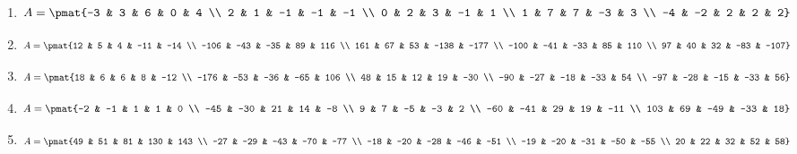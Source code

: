 \begin{enumerate}
\item

\begin{align*}
A = \pmat{-3 & 3 & 6 & 0 & 4 \\ 2 & 1 & -1 & -1 & -1 \\ 0 & 2 & 3 & -1 & 1 \\ 1 & 7 & 7 & -3 & 3 \\ -4 & -2 & 2 & 2 & 2}
\end{align*}

\item

\begin{align*}
A = \pmat{12 & 5 & 4 & -11 & -14 \\ -106 & -43 & -35 & 89 & 116 \\ 161 & 67 & 53 & -138 & -177 \\ -100 & -41 & -33 & 85 & 110 \\ 97 & 40 & 32 & -83 & -107}
\end{align*}

\item

\begin{align*}
A = \pmat{18 & 6 & 6 & 8 & -12 \\ -176 & -53 & -36 & -65 & 106 \\ 48 & 15 & 12 & 19 & -30 \\ -90 & -27 & -18 & -33 & 54 \\ -97 & -28 & -15 & -33 & 56}
\end{align*}

\item

\begin{align*}
A = \pmat{-2 & -1 & 1 & 1 & 0 \\ -45 & -30 & 21 & 14 & -8 \\ 9 & 7 & -5 & -3 & 2 \\ -60 & -41 & 29 & 19 & -11 \\ 103 & 69 & -49 & -33 & 18}
\end{align*}

\item

\begin{align*}
A = \pmat{49 & 51 & 81 & 130 & 143 \\ -27 & -29 & -43 & -70 & -77 \\ -18 & -20 & -28 & -46 & -51 \\ -19 & -20 & -31 & -50 & -55 \\ 20 & 22 & 32 & 52 & 58}
\end{align*}


\end{enumerate}
